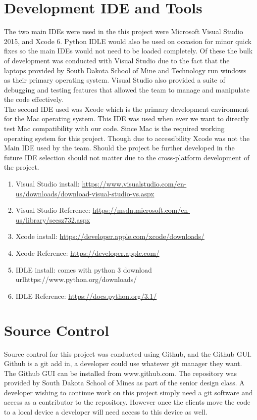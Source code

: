 \section{Development IDE and Tools}
The two main IDEs were used in the this project were Microsoft Visual Studio 2015, and Xcode 6. Python IDLE would also be used on occasion for minor quick fixes so the main IDEs would not need to be loaded completely. Of these the bulk of development was conducted with Visual Studio due to the fact that the laptops provided by South Dakota School of Mine and Technology run windows as their primary operating system. Visual Studio also provided a suite of debugging and testing features that allowed the team to manage and manipulate the code effectively.\\
The second IDE used was Xcode which is the primary development environment for the Mac operating system. This IDE was used when ever we want to directly test Mac compatibility with our code. Since Mac is the required working operating system for this project. Though due to accessibility Xcode was not the Main IDE used by the team. Should the project be further developed in the future IDE selection should not matter due to the cross-platform development of the project.

\begin{enumerate}
\item Visual Studio install: \url{https://www.visualstudio.com/en-us/downloads/download-visual-studio-vs.aspx}
\item Visual Studio Reference: \url{https://msdn.microsoft.com/en-us/library/scesz732.aspx}
\item Xcode install: \url{https://developer.apple.com/xcode/downloads/}
\item Xcode Reference: \url{https://developer.apple.com/}
\item IDLE install: comes with python 3 download url{https://www.python.org/downloads/}
\item IDLE Reference: \url{https://docs.python.org/3.1/}
\end{enumerate}

\section{Source  Control}
Source control for this project was conducted using Github, and the Github GUI. Github is a git add in, a developer  
could use whatever git manager they want. The Github GUI can be installed from www.github.com. The repository was provided by South Dakota School of Mines as part of the senior design class. A developer wishing to continue work on this project simply need a git software and access as a contributor to the repository. However once the clients move the code to a local device a developer will need access to this device as well.
 
